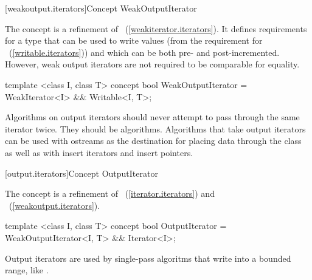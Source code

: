 {\color{newclr}
[weakoutput.iterators]{Concept WeakOutputIterator}
}


\begin{addedblock}
\pnum
The  concept is a refinement of
~(\ref{weakiterator.iterators}). It defines requirements for a type that
can be used to write values (from the requirement for
~(\ref{writable.iterators})) and which can be both pre- and post-incremented.
However, weak output iterators are not required to be comparable for equality.

%
\begin{codeblock}
  template <class I, class T>
  concept bool WeakOutputIterator =
    WeakIterator<I> && Writable<I, T>;
\end{codeblock}
\end{addedblock}

\pnum
\enternote
{}
\textit{}
Algorithms on output iterators should never attempt to pass through the same iterator twice.
They should be
algorithms.
Algorithms that take output iterators can be used with ostreams as the destination
for placing data through the
class as well as with insert iterators and insert pointers.
\exitnote

\begin{addedblock}
{\color{newclr}
[output.iterators]{Concept OutputIterator}
}

\pnum
The  concept is a refinement of ~(\ref{iterator.iterators}) and
~(\ref{weakoutput.iterators}).

%
\begin{codeblock}
  template <class I, class T>
  concept bool OutputIterator =
    WeakOutputIterator<I, T> && Iterator<I>;
\end{codeblock}

\pnum
\enternote Output iterators are used by single-pass
algoritms that write into a bounded range, like .
\exitnote

\end{addedblock}

